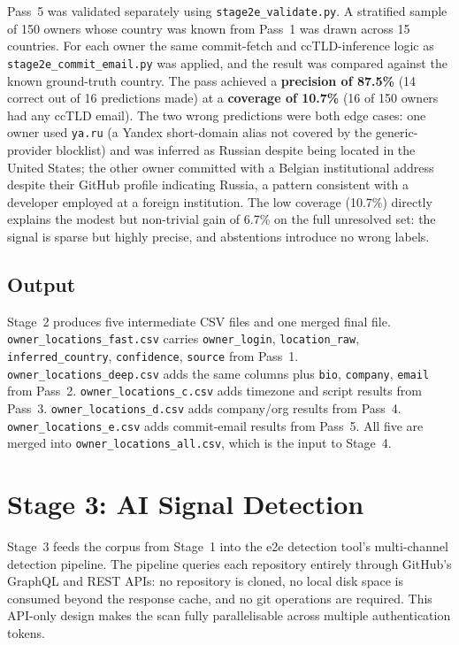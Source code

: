 Pass~5 was validated separately using \texttt{stage2e\_validate.py}. A stratified sample of 150 owners whose country was known from Pass~1 was drawn across 15 countries. For each owner the same commit-fetch and ccTLD-inference logic as \texttt{stage2e\_commit\_email.py} was applied, and the result was compared against the known ground-truth country. The pass achieved a \textbf{precision of 87.5\%} (14 correct out of 16 predictions made) at a \textbf{coverage of 10.7\%} (16 of 150 owners had any ccTLD email). The two wrong predictions were both edge cases: one owner used \texttt{ya.ru} (a Yandex short-domain alias not covered by the generic-provider blocklist) and was inferred as Russian despite being located in the United States; the other owner committed with a Belgian institutional address despite their GitHub profile indicating Russia, a pattern consistent with a developer employed at a foreign institution. The low coverage (10.7\%) directly explains the modest but non-trivial gain of 6.7\% on the full unresolved set: the signal is sparse but highly precise, and abstentions introduce no wrong labels.

\subsection{Output}

Stage~2 produces five intermediate CSV files and one merged final file. \texttt{owner\_locations\_fast.csv} carries \texttt{owner\_login}, \texttt{location\_raw}, \texttt{inferred\_country}, \texttt{confidence}, \texttt{source} from Pass~1. \texttt{owner\_locations\_deep.csv} adds the same columns plus \texttt{bio}, \texttt{company}, \texttt{email} from Pass~2. \texttt{owner\_locations\_c.csv} adds timezone and script results from Pass~3. \texttt{owner\_locations\_d.csv} adds company/org results from Pass~4. \texttt{owner\_locations\_e.csv} adds commit-email results from Pass~5. All five are merged into \texttt{owner\_locations\_all.csv}, which is the input to Stage~4.

\section{Stage 3: AI Signal Detection}
\label{sec:impl:detection}

Stage~3 feeds the corpus from Stage~1 into the e2e detection tool's multi-channel detection pipeline. The pipeline queries each repository entirely through GitHub's GraphQL and REST APIs: no repository is cloned, no local disk space is consumed beyond the response cache, and no git operations are required. This API-only design makes the scan fully parallelisable across multiple authentication tokens.

